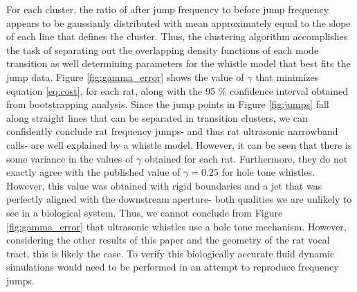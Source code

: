 \documentclass[twocolumn, prl]{revtex4}
\begin{document}
For each cluster, the ratio of after jump frequency to before jump frequency appears to be gaussianly distributed with mean approximately equal to the slope of each line that defines the cluster. Thus, the clustering algorithm accomplishes the task of separating out the overlapping density functions of each mode transition as well determining parameters for the whistle model that best fits the jump data. Figure \ref{fig:gamma_error} shows the value of $\gamma$ that minimizes equation \ref{eq:cost}, for each rat, along with the 95 \% confidence interval obtained from bootstrapping analysis. Since the jump points in Figure \ref{fig:jumps} fall along straight lines that can be separated in transition clusters, we can confidently conclude rat frequency jumps- and thus rat ultrasonic narrowband calls- are well explained by a whistle model. However, it can be seen that there is some variance in the values of $\gamma$ obtained for each rat. Furthermore, they do not exactly agree with the published value of $\gamma=0.25$ for hole tone whistles. However, this value was obtained with rigid boundaries and a jet that was perfectly aligned with the downstream aperture- both qualities we are unlikely to see in a biological system. Thus, we cannot conclude from Figure \ref{fig:gamma_error} that ultrasonic whistles use a hole tone mechanism. However, considering the other results of this paper and the geometry of the rat vocal tract, this is likely the case. To verify this biologically accurate fluid dynamic simulations would need to be performed in an attempt to reproduce frequency jumps. 
\end{document}
